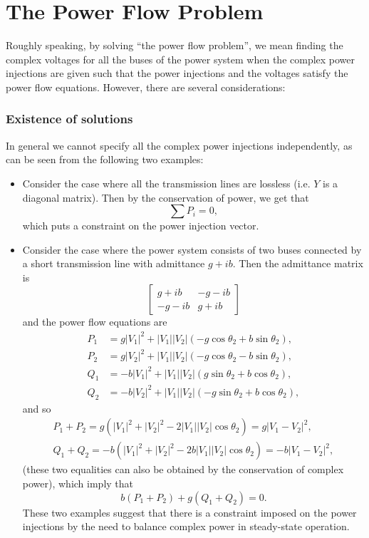 \section{The Power Flow Problem}
Roughly speaking, by solving “the power flow problem”, we mean finding the complex voltages for all the buses of the power system when the complex power injections are given such that the power injections and the voltages satisfy the power flow equations. However, there are several considerations:
\subsubsection*{Existence of solutions}
In general we cannot specify all the complex power injections independently, as can be seen from the following two examples:
\begin{itemize}
\item  Consider the case where all the transmission lines are lossless (i.e. $Y$ is a diagonal matrix). Then by the conservation of power, we get that
\[\sum P_i=0,\]
which puts a constraint on the power injection vector.

\item  Consider the case where the power system consists of two buses connected by a short transmission line with admittance $ g + ib$. Then the admittance matrix is
\[\begin{bmatrix} g+ib & -g-ib\\-g-ib & g+ib\end{bmatrix}\]
and the power flow equations are
\begin{align}
P_1 &= g|V_1|^2 + |V_1||V_2|(-g \cos{\theta_2} + b \sin{\theta_2}),\\ P_2 &= g|V_2|^2 + |V_1||V_2|(-g \cos{\theta_2} -b \sin{\theta_2}),\\ 
Q_1 &= -b|V_1|^2 + |V_1||V_2|(g \sin{\theta_2} + b \cos{\theta_2}),\\ Q_2 &= -b|V_2|^2 + |V_1||V_2|(-g \sin{\theta_2} + b \cos{\theta_2}),
\end{align}
and so
\begin{align}
P_1 + P_2 = g(|V_1|^2 + |V_2|^2 -2|V_1||V_2| \cos{\theta_2}) = g|V_1 -V_2|^2,\\
Q_1 + Q_2 = -b(|V_1|^2 + |V_2|^2 - 2b|V_1||V_2| \cos{\theta_2}) = -b|V_1 -V_2|^2,
\end{align} (these two equalities can also be obtained by the conservation of complex
power), which imply that
\[b(P_1 +P_2)+g(Q_1 +Q_2)=0.\]
These two examples suggest that there is a constraint imposed on the power injections by the need to balance complex power in steady-state operation.
\end{itemize}
